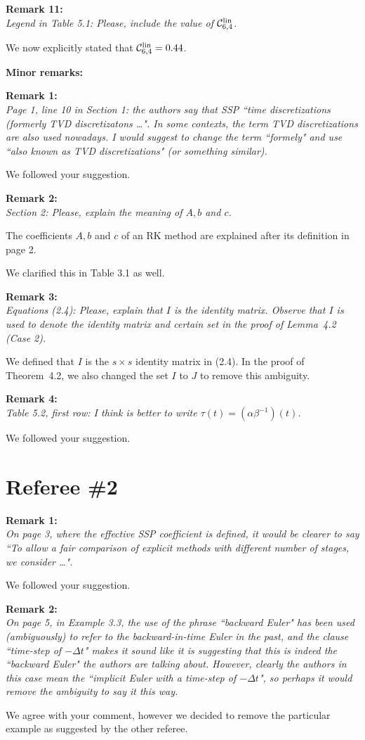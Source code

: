 \documentclass[12pt]{article}
\newcommand{\remark}[2]{\vspace{25pt} \noindent \textbf{Remark #1:\newline} \textit{#2}\vspace{15pt}}
\renewcommand{\newline}{\vspace{15pt}\\}
\newcommand{\sspcoef}{\mathcal{C}}
\begin{document}
\pagebreak

\remark{11}{
Legend in Table 5.1: Please, include the value of $\sspcoef^{\textnormal{lin}}_{6,4}$.}

We now explicitly stated that $\sspcoef^{\textnormal{lin}}_{6,4}=0.44$.
\vspace{40pt}

\noindent \textbf{\large Minor remarks:}

\remark{1}{
Page 1, line 10 in Section 1: the authors say that SSP ``time discretizations (formerly
TVD discretizatons \dots". 
In some contexts, the term TVD discretizations are also used nowadays. 
I would suggest to change the term ``formely" and use ``also known as TVD discretizations" 
(or something similar).}

We followed your suggestion.

\remark{2}{
Section 2: Please, explain the meaning of $A, b$ and $c$.}

The coefficients $A, b$ and $c$ of an RK method are explained after its definition in page 2.

We clarified this in Table 3.1 as well.

\remark{3}{
Equations (2.4): Please, explain that $I$ is the identity matrix. Observe that $I$ is used to
denote the identity matrix and certain set in the proof of Lemma~4.2 (Case 2).}

We defined that $I$ is the $s \times s$ identity matrix in (2.4).
In the proof of Theorem~4.2, we also changed the set $I$ to $J$ to remove this ambiguity.

\remark{4}{
Table 5.2, first row: I think is better to write $\tau(t) = (\alpha\beta^{-1})(t)$.}

We followed your suggestion.

\vspace{50pt}

\section*{Referee \#2}
\remark{1}{
On page 3, where the effective SSP coefficient is defined, it would be clearer to say
``To allow a fair comparison of explicit methods with different number of stages, we consider \dots". }

We followed your suggestion.

\remark{2}{
On page 5, in Example 3.3, the use of the phrase ``backward Euler" has been used 
(ambiguously) to refer to the backward-in-time Euler in the past, and the clause 
``time-step of $-\Delta t$" makes it sound like it is suggesting that this is indeed 
the ``backward Euler" the authors are talking about. 
However, clearly the authors in this case mean the ``implicit Euler with a time-step 
of $-\Delta t$", so perhaps it would remove the ambiguity to say it this way.}

We agree with your comment, however we decided to remove the particular example 
as suggested by the other referee.
\end{document}
